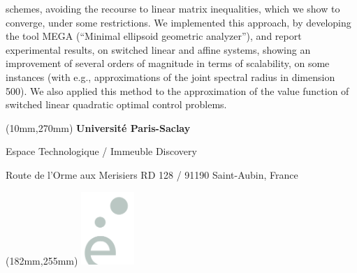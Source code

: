 \documentclass[a4paper]{article}
\begin{document}
\begin{center}
{{\begin{multicols}{2}
schemes, avoiding the recourse to linear matrix inequalities, which we
show to converge, under some restrictions. We implemented this
approach, by developing the tool MEGA (``Minimal ellipsoid geometric
analyzer''), and report experimental results, on switched linear and
affine systems, showing an improvement of several orders of magnitude
in terms of scalability, on some instances (with e.g., approximations
of the joint spectral radius in dimension 500).  We also applied this
method to the approximation of the value function of switched linear
quadratic optimal control problems.
\end{multicols}
}}
\end{center}


\begin{textblock*}{161mm}(10mm,270mm)
\color{bordeau}
{\bf\noindent Université Paris-Saclay	         }

\noindent Espace Technologique / Immeuble Discovery 

\noindent Route de l’Orme aux Merisiers RD 128 / 91190 Saint-Aubin, France 
\end{textblock*}

\begin{textblock*}{20mm}(182mm,255mm)
\includegraphics[width=20mm]{images/image36}
\end{textblock*}
\end{document}
